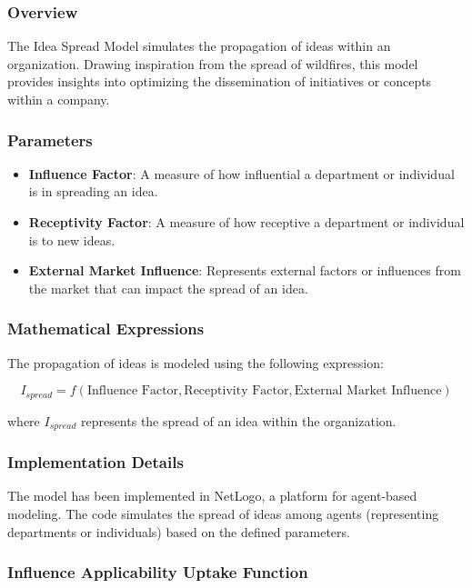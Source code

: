 \documentclass[sn-nature]{sn-jnl}%
\theoremstyle{thmstyleone}%
\theoremstyle{thmstyletwo}%
\theoremstyle{thmstylethree}%
\begin{document}
\subsubsection{Overview}
The Idea Spread Model simulates the propagation of ideas within an organization. Drawing inspiration from the spread of wildfires, this model provides insights into optimizing the dissemination of initiatives or concepts within a company.

\subsubsection{Parameters}
\begin{itemize}
    \item \textbf{Influence Factor}: A measure of how influential a department or individual is in spreading an idea.
    \item \textbf{Receptivity Factor}: A measure of how receptive a department or individual is to new ideas.
    \item \textbf{External Market Influence}: Represents external factors or influences from the market that can impact the spread of an idea.
\end{itemize}

\subsubsection{Mathematical Expressions}
The propagation of ideas is modeled using the following expression:

\begin{equation}
I_{spread} = f(\text{Influence Factor}, \text{Receptivity Factor}, \text{External Market Influence})
\end{equation}

where \( I_{spread} \) represents the spread of an idea within the organization.

\subsubsection{Implementation Details}
The model has been implemented in NetLogo, a platform for agent-based modeling. The code simulates the spread of ideas among agents (representing departments or individuals) based on the defined parameters.
\subsubsection{Influence Applicability Uptake Function}
\end{document}
